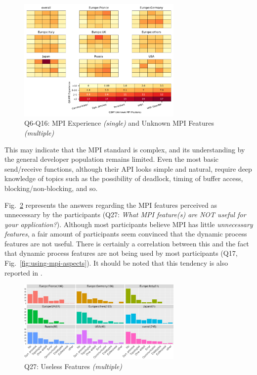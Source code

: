 \documentclass[preprint,5p,times]{elsarticle}
\def\myquote#1{{\it #1}}
\begin{document}
\begin{figure}[tb]
  \begin{center}
    \includegraphics[width=8.0cm]{Figs/Q6-Q16.pdf}
    \vspace{-1.5mm}
    \caption{Q6-Q16: MPI Experience {\it(single)} and Unknown MPI Features {\it(multiple)}}
    \label{fig:experience-and-aspects}
\vspace{-3mm}%
  \end{center}
\end{figure}

This may indicate that the MPI standard is complex, and its understanding by the
general developer population remains limited. Even the most basic send/receive
functions, although their API looks simple and natural, require deep knowledge
of topics such as the possibility of deadlock, timing of buffer access, blocking/non-blocking,
and so.

Fig.~\ref{fig:useless-features} represents the answers regarding the MPI features
perceived as unnecessary by the participants (Q27: \myquote{What MPI feature(s)
are NOT useful for your application?}). Although most participants believe MPI
has little {\it unnecessary features}, a fair amount of participants seem
convinced that the dynamic process features are not useful. There is certainly a
correlation between this and the fact that dynamic process features are not being
used by most participants (Q17, Fig.~\ref{fig:using-mpi-aspects}). It should
be noted that this tendency is also reported in \cite{10.1145/3295500.3356176}.

\begin{figure}[tb]
  \begin{center}
    \includegraphics[width=8.0cm]{R-scripts/Q27.pdf}
    \vspace{-1.5mm}
    \caption{Q27: Useless Features {\it(multiple)}}
    \label{fig:useless-features}
\vspace{-3mm}%
  \end{center}
\end{figure}
\end{document}
